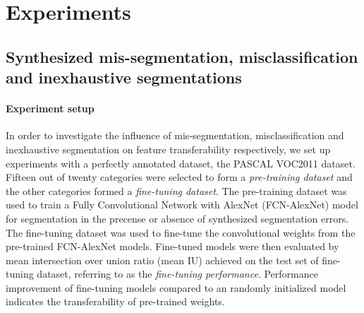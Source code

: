 \section{Experiments}
\label{sec:experiments}

\subsection{Synthesized mis-segmentation, misclassification and inexhaustive segmentations}
\label{subsec:robustness}

\paragraph{Experiment setup}
\noindent
In order to investigate the influence of mis-segmentation, misclassification and inexhaustive segmentation on feature transferability respectively, we set up experiments with a perfectly annotated dataset, the PASCAL VOC2011 dataset\cite{everingham2015pascal}.
Fifteen out of twenty categories were selected to form a \textit{pre-training dataset} and the other categories formed a \textit{fine-tuning dataset}.
The pre-training dataset was used to train a Fully Convolutional Network with AlexNet (FCN-AlexNet) model\cite{long2015fully} for segmentation in the precense or absence of synthesized segmentation errors.
The fine-tuning dataset was used to fine-tune the convolutional weights from the pre-trained FCN-AlexNet models.
Fine-tuned models were then evaluated by mean intersection over union ratio (mean IU) achieved on the test set of fine-tuning dataset, referring to as the \textit{fine-tuning performance}.
Performance improvement of fine-tuning models compared to an randomly initialized model indicates the transferability of pre-trained weights.

